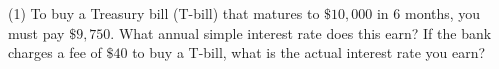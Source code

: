 \documentclass[../mathNotesPreamble]{subfiles}
\begin{document}
  \begin{ex*}\mbox{}
    \begin{extasks}[after-item-skip=\stretch{1}](1)
      \task To buy a Treasury bill (T-bill) that matures to $\$10,000$ in $6$ months, you must pay $\$9,750$. What annual simple interest rate does this earn?
      \task If the bank charges a fee of $\$40$ to buy a T-bill, what is the actual interest rate you earn?
    \end{extasks}
  \end{ex*}
  \pagebreak
  

  \pagebreak
\end{document}
